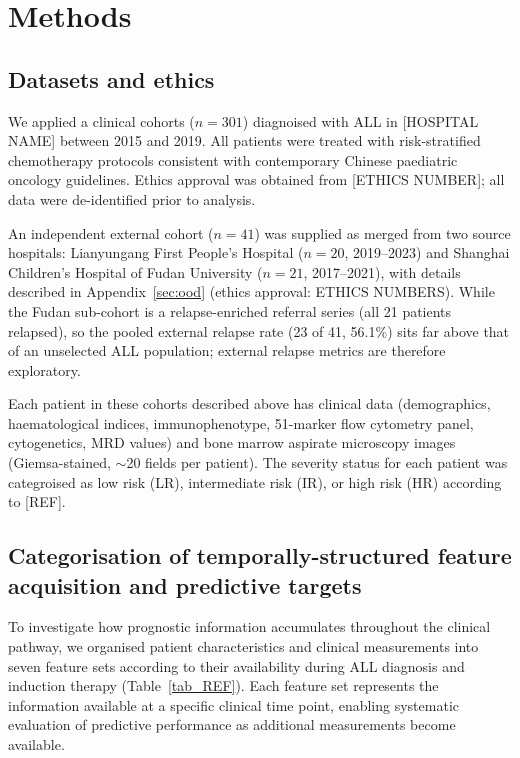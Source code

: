 \documentclass[pdflatex,sn-nature]{sn-jnl}
\begin{document}
\section{Methods}\label{sec:methods}

\subsection{Datasets and ethics}\label{sec:dataset}


We applied a clinical cohorts ($n=301$) diagnoised with ALL in [HOSPITAL NAME] between 2015 and 2019. All patients were treated with risk-stratified chemotherapy protocols consistent with contemporary Chinese paediatric oncology guidelines. Ethics approval was obtained from [ETHICS NUMBER]; all data were de-identified prior to analysis. 

An independent external cohort ($n=41$) was supplied as merged from two source hospitals: Lianyungang First People's Hospital ($n=20$, 2019--2023) and Shanghai Children's Hospital of Fudan University ($n=21$, 2017--2021), with details described in Appendix~\ref{sec:ood} (ethics approval: ETHICS NUMBERS). While the Fudan sub-cohort is a relapse-enriched referral series (all 21 patients relapsed), so the pooled external relapse rate (23 of 41, 56.1\%) sits far above that of an unselected ALL population; external relapse metrics are therefore exploratory.

Each patient in these cohorts described above has clinical data (demographics, haematological indices, immunophenotype, 51-marker flow cytometry panel, cytogenetics, MRD values) and bone marrow aspirate microscopy images (Giemsa-stained, $\sim$20 fields per patient). The severity status for each patient was categroised as low risk (LR), intermediate risk (IR), or high risk (HR) according to [REF].

\subsection{Categorisation of temporally-structured feature acquisition and predictive targets}\label{sec:features}

To investigate how prognostic information accumulates throughout the clinical pathway, we organised patient characteristics and clinical measurements into seven feature sets according to their availability during ALL diagnosis and induction therapy (Table~\ref{tab_REF}). Each feature set represents the information available at a specific clinical time point, enabling systematic evaluation of predictive performance as additional measurements become available.
\end{document}
